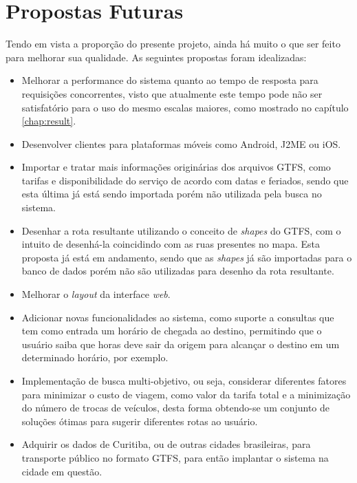 \section{Propostas Futuras}
\label{sec:propostas}
Tendo em vista a proporção do presente projeto, ainda há muito o que ser feito para melhorar sua qualidade.
As seguintes propostas foram idealizadas:

\begin{itemize}
	\item Melhorar a performance do sistema quanto ao tempo de resposta para requisições concorrentes, visto que atualmente este tempo pode não ser satisfatório para o uso do mesmo escalas maiores, como mostrado no capítulo \ref{chap:result}.
	\item Desenvolver clientes para plataformas móveis como Android, J2ME ou iOS.
	\item Importar e tratar mais informações originárias dos arquivos GTFS, como tarifas e disponibilidade do serviço de acordo com datas e feriados, sendo que esta última já está sendo importada porém não utilizada pela busca no sistema.
	\item Desenhar a rota resultante utilizando o conceito de \emph{shapes} do GTFS, com o intuito de desenhá-la coincidindo com as ruas presentes no mapa.
Esta proposta já está em andamento, sendo que as \emph{shapes} já são importadas para o banco de dados porém não são utilizadas para desenho da rota resultante.
	\item Melhorar o \emph{layout} da interface \emph{web}.
	\item Adicionar novas funcionalidades ao sistema, como suporte a consultas que tem como entrada um horário de chegada ao destino, permitindo que o usuário saiba que horas deve sair da origem para alcançar o destino em um determinado horário, por exemplo.
	\item Implementação de busca multi-objetivo, ou seja, considerar diferentes fatores para minimizar o custo de viagem, como valor da tarifa total e a minimização 		do número de trocas de veículos, desta forma obtendo-se um conjunto de soluções ótimas para sugerir diferentes rotas ao usuário.
	\item Adquirir os dados de Curitiba, ou de outras cidades brasileiras, para transporte público no formato GTFS, para então implantar o sistema na cidade em questão.
\end{itemize}
